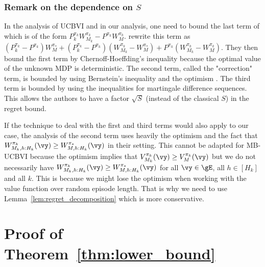 \begin{subappendices}
\subsubsection{Remark on the dependence on $S$}
\label{sssec:ucbvi_s}

In the analysis of UCBVI and in our analysis, one need to bound the last term of 
which is of the form ${P_k^{\pi_k}W^{\pi_k}_{M_k} -P^{\pi_k}W^{\pi_k}_{M}}$. \cite{azar2017minimax} rewrite this term as
$(P_k^{\pi_k} -P^{\pi_k})W^{\pi_*}_M +(P_k^{\pi_k} -P^{\pi_k})(W^{\pi_k}_{M_k} -W^{\pi_*}_M) +P^{\pi_k}(W^{\pi_k}_{M_k} {-}W^{\pi_k}_{M})$.
They then bound the first term by Chernoff-Hoeffding's inequality because the optimal value of the unknown MDP is deterministic.
The second term, called the "correction" term, is bounded by using Bernstein's inequality and the optimism \cite[Step 1, page 6]{azar2017minimax}. The third term is bounded by using the inequalities for martingale difference sequences. This allows the authors to have a factor $\sqrt{S}$ (instead of the classical $S$) in the regret bound.

If the technique to deal with the first and third terms would also apply to our case, the analysis of the second term uses heavily the optimism and the fact that $W^{\pi_k}_{M_k,h:H_k}(\vy)\ge W^{\pi_*}_{M,h:H_k}(\vy)$ in their setting. This cannot be adapted for MB-UCBVI because the optimism implies that $V^{\pi_k}_{M_k}(\vy) \ge V^{\pi_k}_{M}(\vy)$ but we do not necessarily have $W^{\pi_k}_{M_k,h:H_k}(\vy)\ge W^{\pi_*}_{M,h:H_k}(\vy)$ for all $\vy\in\gE$, all $h\in[H_k]$ and all $k$.  This is because we might lose the optimism when working with the value function over random episode length.
That is why we need to use Lemma~\ref{lem:regret_decomposition} which is more conservative.

\section{Proof of Theorem~\ref{thm:lower_bound}}
\label{apx:sketch_of_proof_lower}


\end{subappendices}
